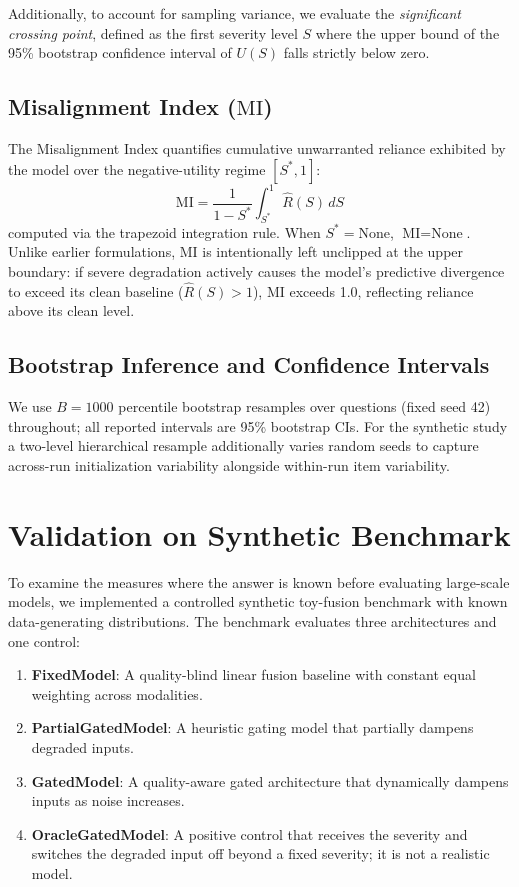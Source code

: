 \documentclass[graybox]{svmult}
\newcommand{\mi}{\text{MI}}
\begin{document}
Additionally, to account for sampling variance, we evaluate the \emph{significant crossing point}, defined as the first severity level $S$ where the upper bound of the 95\% bootstrap confidence interval of $U(S)$ falls strictly below zero.

\subsection{Misalignment Index ($\mi$)}
The Misalignment Index quantifies cumulative unwarranted reliance exhibited by the model over the negative-utility regime $[S^*, 1]$:
\begin{equation}
\mi = \frac{1}{1 - S^*} \int_{S^*}^1 \hat{R}(S) \, dS
\end{equation}
computed via the trapezoid integration rule. When $S^* = \text{None}$, $\mi = \text{None}$.
Unlike earlier formulations, $\mi$ is intentionally left unclipped at the upper boundary: if severe degradation actively causes the model's predictive divergence to exceed its clean baseline ($\hat{R}(S) > 1$), $\mi$ exceeds 1.0, reflecting reliance above its clean level.

\subsection{Bootstrap Inference and Confidence Intervals}
We use $B=1000$ percentile bootstrap resamples over questions (fixed seed 42) throughout; all reported intervals are 95\% bootstrap CIs. For the synthetic study a two-level hierarchical resample additionally varies random seeds to capture across-run initialization variability alongside within-run item variability.

\section{Validation on Synthetic Benchmark}
\label{sec:synthetic}

To examine the measures where the answer is known before evaluating large-scale models, we implemented a controlled synthetic toy-fusion benchmark with known data-generating distributions. The benchmark evaluates three architectures and one control:
\begin{enumerate}
    \item \textbf{FixedModel}: A quality-blind linear fusion baseline with constant equal weighting across modalities.
    \item \textbf{PartialGatedModel}: A heuristic gating model that partially dampens degraded inputs.
    \item \textbf{GatedModel}: A quality-aware gated architecture that dynamically dampens inputs as noise increases.
    \item \textbf{OracleGatedModel}: A positive control that receives the severity and switches the degraded input off beyond a fixed severity; it is not a realistic model.
\end{enumerate}
\end{document}
